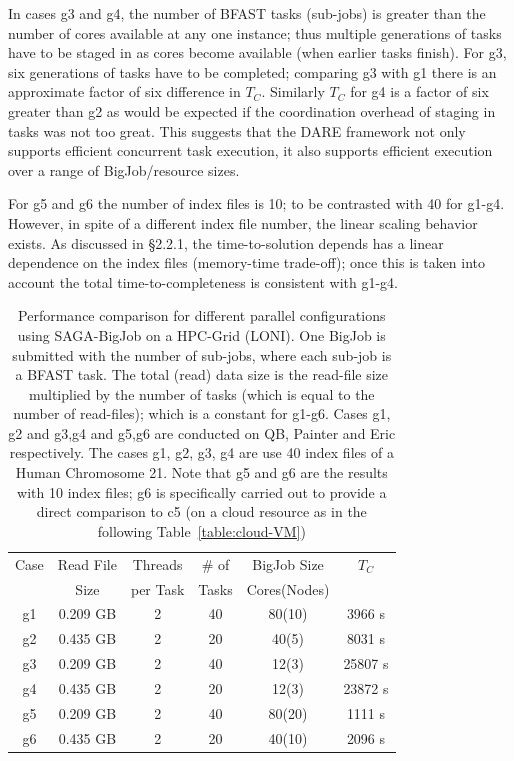 \documentclass{acm_proc_article-sp}
\begin{document}
In cases g3 and g4, the number of BFAST tasks (sub-jobs) is greater
than the number of cores available at any one instance; thus multiple
generations of tasks have to be staged in as cores become available
(when earlier tasks finish).  For g3, six generations of tasks have to
be completed; comparing g3 with g1 there is an approximate factor of
six difference in $T_C$. Similarly $T_C$ for g4 is a factor of six
greater than g2 as would be expected if the coordination overhead of
staging in tasks was not too great. This suggests that the DARE
framework not only supports efficient concurrent task execution, it
also supports efficient execution over a range of BigJob/resource
sizes.

For g5 and g6 the number of index files is 10; to be contrasted with
40 for g1-g4.  However, in spite of a different index file number, the
linear scaling behavior exists.  As discussed in \S 2.2.1, the
time-to-solution depends has a linear dependence on the index files
(memory-time trade-off); once this is taken into account the total
time-to-completeness is consistent with g1-g4.


 \begin{table}
 \small
 \begin{tabular}{|c|c|c|c|c|c|} 
 \hline 
Case & Read File & Threads   &  \# of & BigJob Size   &   $T_C$   \\
   & Size& per Task & Tasks  & Cores(Nodes)  & \\
   \hline
g1 & 0.209 GB & 2 &   40 &  80(10) & 3966 s \\
g2 & 0.435 GB & 2 &  20 & 40(5) & 8031 s\\ \hline
g3  & 0.209 GB& 2 & 40  & 12(3) & 25807 s \\
g4 & 0.435 GB& 2 & 20  & 12(3) & 23872 s  \\ \hline
\hline
g5 & 0.209 GB& 2& 40 & 80(20) & 1111 s \\
g6&0.435 GB&2& 20 & 40(10)&2096 s\\
\hline
\end{tabular}
\caption{Performance comparison for different parallel configurations
  using SAGA-BigJob on a HPC-Grid (LONI). One BigJob is submitted with
  the number of sub-jobs, where each sub-job is a BFAST task.  The
  total (read) data size is the read-file size multiplied by the
  number of tasks (which is equal to the number of read-files); which
  is a constant for g1-g6.  Cases g1, g2 and g3,g4 and g5,g6 are
  conducted on QB, Painter and Eric respectively. The cases g1, g2,
  g3, g4 are use 40 index files of a Human Chromosome 21.  Note that
  g5 and g6 are the results with 10 index files; g6 is specifically
  carried out to provide a direct comparison to c5 (on a cloud
  resource as in the following Table~\ref{table:cloud-VM}) }
  
  \label{table:bigjob-loni} 
\end{table}
\end{document}
